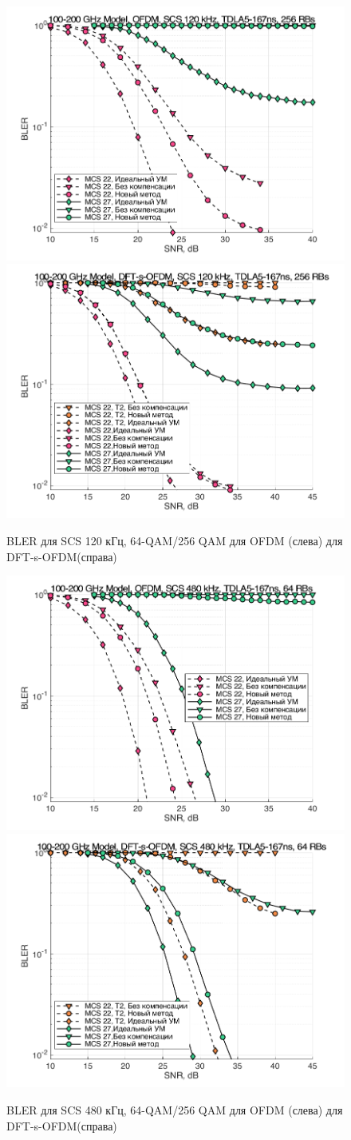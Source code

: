 \begin{figure}[h!]
    \centering
    \includegraphics[width=0.49\linewidth]{figs/res/ofdm/OFDM_SubTHz_SCS120_MCS22_27.png}
    \includegraphics[width=0.49\linewidth]{figs/res/dftsofdm/DFT-s-OFDM_SubTHz_SCS120_MCS22_27.png}
    \caption{BLER для SCS 120 кГц, 64-QAM/256 QAM для OFDM (слева) для DFT-s-OFDM(справа)}
    \label{fig:res100200_scs120}
\end{figure}

\begin{figure}[h!]
    \centering
    \includegraphics[width=0.49\linewidth]{figs/res/ofdm/OFDM_SubTHz_SCS480_MCS22_27.png}
    \includegraphics[width=0.49\linewidth]{figs/res/dftsofdm/DFT-s-OFDM_SubTHz_SCS480_MCS22_27.png}
    \caption{BLER для SCS 480 кГц, 64-QAM/256 QAM для OFDM (слева) для DFT-s-OFDM(справа)}
    \label{fig:res100200_scs480}
\end{figure}


